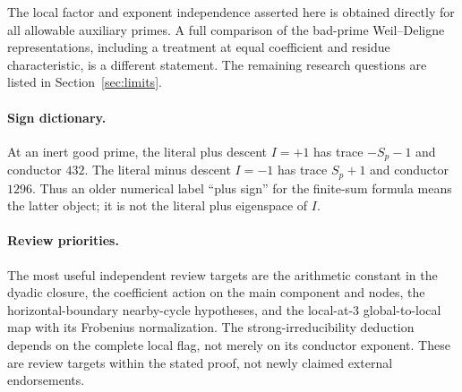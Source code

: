 The local factor and exponent independence asserted here is obtained
directly for all allowable auxiliary primes. A full comparison of the
bad-prime Weil--Deligne representations, including a treatment at equal
coefficient and residue characteristic, is a different statement.
The remaining research questions are listed in Section~\ref{sec:limits}.

\paragraph{Sign dictionary.}
At an inert good prime, the literal plus descent $I=+1$ has trace
$-S_p-1$ and conductor $432$. The literal minus descent $I=-1$ has trace
$S_p+1$ and conductor $1296$. Thus an older numerical label ``plus sign''
for the finite-sum formula means the latter object; it is not the
literal plus eigenspace of $I$.

\paragraph{Review priorities.}
The most useful independent review targets are the arithmetic constant
in the dyadic closure, the coefficient action on the main component and
nodes, the horizontal-boundary nearby-cycle hypotheses, and the
local-at-$3$ global-to-local map with its Frobenius normalization.
The strong-irreducibility deduction depends on the complete local flag,
not merely on its conductor exponent. These are review targets within
the stated proof, not newly claimed external endorsements.
